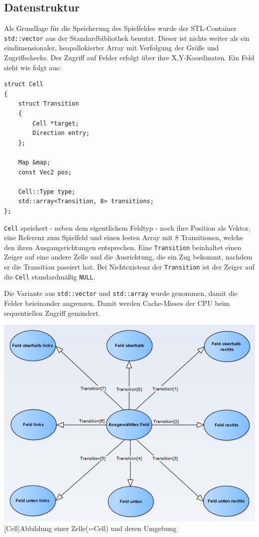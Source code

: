 \documentclass[12pt,a4paper]{article}
\begin{document}
\subsection{Datenstruktur}
Als Grundlage für die Speicherung des Spielfeldes wurde der STL-Container \texttt{std::vector} aus der Standardbibliothek benutzt. Dieser ist nichts weiter als ein eindimensionaler, heapallokierter Array mit Verfolgung der Größe und Zugriffschecks. Der Zugriff auf Felder erfolgt über ihre X,Y-Koordinaten.
Ein Feld sieht wie folgt aus:

\begin{lstlisting}[caption=\texttt{Cell} Struktur, label=lst:cell-struct]
struct Cell
{
	struct Transition
	{
		Cell *target;
		Direction entry;
	};
	
	Map &map;
	const Vec2 pos;
	
	Cell::Type type;
	std::array<Transition, 8> transitions;
};
\end{lstlisting}

\texttt{Cell} speichert - neben dem eigentlichem Feldtyp - noch ihre Position als Vektor, eine Referenz zum Spielfeld und einen festen Array mit 8 Transitionen, welche den ihren Ausgangsrichtungen entsprechen.
Eine \texttt{Transition} beinhaltet einen Zeiger auf eine andere Zelle und die Ausrichtung, die ein Zug bekommt, nachdem er die Transition passiert hat.
Bei Nichtexistenz der \texttt{Transition} ist der Zeiger auf die \texttt{Cell} standardmäßig \texttt{NULL}.

Die Variante aus \texttt{std::vector} und \texttt{std::array} wurde genommen, damit die Felder beieinander angrenzen. Damit werden Cache-Misses der CPU beim sequentiellen Zugriff gemindert.\newline

\begin{minipage}{\linewidth}
	\centering
	\includegraphics[width=0.4\linewidth]{pics/BRYX-Cell.PNG}
	[Cell]{Abbildung einer Zelle(=Cell) und deren Umgebung}
	\label{fig:cell}
\end{minipage}

\newpage
\end{document}
